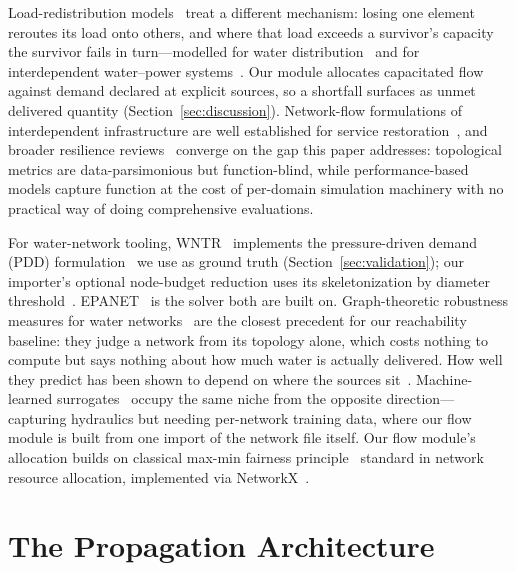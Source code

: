 \documentclass{svproc}
\begin{document}
Load-redistribution models~\cite{motter_cascade-based_2002,crucitti_model_2004} treat a
different mechanism: losing one element reroutes its load onto others, and where
that load exceeds a survivor's capacity the survivor fails in turn---modelled
for water distribution~\cite{shuang_performance_2014} and for
interdependent water--power systems~\cite{li_cascading_2025}. Our module
allocates capacitated flow against demand declared at explicit sources, so a
shortfall surfaces as unmet delivered quantity (Section~\ref{sec:discussion}).
Network-flow formulations of interdependent infrastructure are well established for service
restoration~\cite{lee_restoration_2007}, and broader resilience
reviews~\cite{de_marco_quantitative_2025,hines_topological_2010} converge on the
gap this paper addresses: topological metrics are data-parsimonious but
function-blind, while performance-based models capture function at the cost of
per-domain simulation machinery with no practical way of doing comprehensive evaluations.

For water-network tooling, WNTR~\cite{klise_software_2017} implements the
pressure-driven demand (PDD) formulation~\cite{wagner_water_1988} we use
as ground truth (Section~\ref{sec:validation}); our importer's optional
node-budget reduction uses its skeletonization by diameter
threshold~\cite{saldarriaga_water_2012}. EPANET~\cite{rossman2000epanet}
is the solver both are built on. Graph-theoretic robustness measures for water
networks~\cite{yazdani_complex_2011,herrera_graph_2016} are the closest
precedent for our reachability baseline: they judge a network from its topology
alone, which costs nothing to compute but says nothing about how much water is
actually delivered. How well they predict has been shown to depend on where the
sources sit~\cite{meng_topological_2018}. Machine-learned
surrogates~\cite{garzon_machine_2022} occupy the same niche from the
opposite direction---capturing hydraulics but needing per-network
training data, where our flow module is built from
one import of the network file itself. Our flow module's
allocation builds on classical max-min fairness
principle~\cite{nace_tutorial_2006} standard in network resource
allocation, implemented via NetworkX~\cite{hagberg_exploring_2008}.

\section{The Propagation Architecture}\label{sec:architecture}
\end{document}

